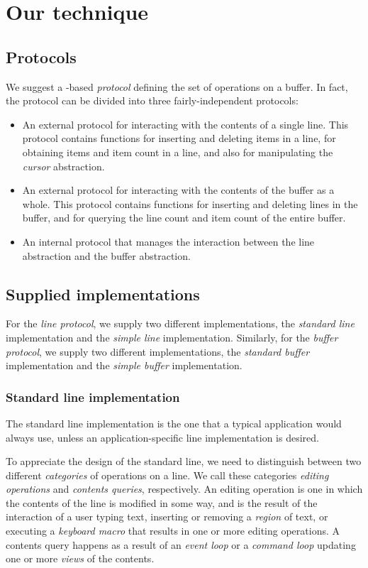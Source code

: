 \section{Our technique}

\subsection{Protocols}

We suggest a \clos{}-based \emph{protocol} defining the set of
operations on a buffer.  In fact, the protocol can be divided into
three fairly-independent protocols:

\begin{itemize}
\item An external protocol for interacting with the contents of a
  single line.  This protocol contains functions for inserting and
  deleting items in a line, for obtaining items and item count in a
  line, and also for manipulating the \emph{cursor} abstraction.
\item An external protocol for interacting with the contents of the
  buffer as a whole.  This protocol contains functions for inserting
  and deleting lines in the buffer, and for querying the line count
  and item count of the entire buffer.
\item An internal protocol that manages the interaction between the
  line abstraction and the buffer abstraction.
\end{itemize}

\subsection{Supplied implementations}

For the \emph{line protocol}, we supply two different implementations,
the \emph{standard line} implementation and the \emph{simple line}
implementation.  Similarly, for the \emph{buffer protocol}, we supply
two different implementations, the \emph{standard buffer} implementation
and the \emph{simple buffer} implementation.

\subsubsection{Standard line implementation}

The standard line implementation is the one that a typical application
would always use, unless an application-specific line implementation
is desired.

To appreciate the design of the standard line, we need to distinguish
between two different \emph{categories} of operations on a line.  We
call these categories \emph{editing operations} and \emph{contents
  queries}, respectively.  An editing operation is one in which the
contents of the line is modified in some way, and is the result of the
interaction of a user typing text, inserting or removing a
\emph{region} of text, or executing a \emph{keyboard macro} that
results in one or more editing operations.  A contents query happens
as a result of an \emph{event loop} or a \emph{command loop} updating
one or more \emph{views} of the contents.

